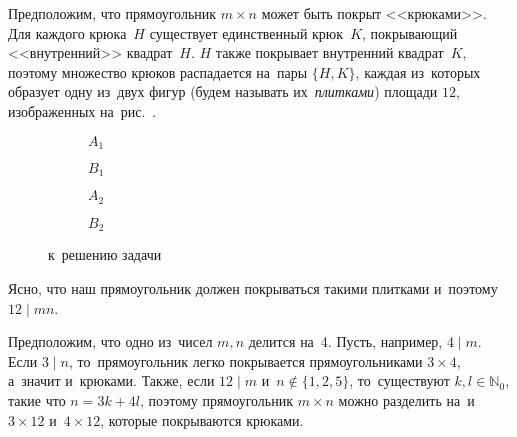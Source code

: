 \ifincludesolutions
Предположим, что прямоугольник $m \times n$ может быть покрыт <<крюками>>.
Для каждого крюка~$H$ существует единственный крюк~$K$, покрывающий
<<внутренний>> квадрат~$H$.
$H$ также покрывает внутренний квадрат~$K$, поэтому множество крюков
распадается на~пары $\{ H, K \}$, каждая из~которых образует одну из~двух фигур
(будем называть их~\emph{плитками}) площади $12$, изображенных
на~рис.~.
\begin{figure}[ht]\begin{center}
\strut\hfill
    \begin{subfigure}{0.2\linewidth}\begin{center}
     $A_1$
    \end{center}\end{subfigure}
\hfill
    \begin{subfigure}{0.15\linewidth}\begin{center}
     $B_1$
    \end{center}\end{subfigure}
\hfill
    \begin{subfigure}{0.2\linewidth}\begin{center}
     $A_2$
    \end{center}\end{subfigure}
\hfill
    \begin{subfigure}{0.2\linewidth}\begin{center}
     $B_2$
    \end{center}\end{subfigure}
\hfill\strut
\caption{к~решению
    задачи~}%
\end{center}\end{figure}
Ясно, что наш прямоугольник должен покрываться такими плитками и~поэтому
$12 \mid m n$.
\par
Предположим, что одно из~чисел $m, n$ делится на~4.
Пусть, например, $4 \mid m$.
Если $3 \mid n$, то~прямоугольник легко покрывается прямоугольниками
$3 \times 4$, а~значит и~крюками.
Также, если $12 \mid m$ и~$n \not\in \{1, 2, 5\}$, то~существуют
$k,l\in\mathbb{N}_0$, такие что $n=3k+4l$, поэтому прямоугольник $m\times n$
можно разделить на~и~$3\times 12$ и~$4\times 12$, которые покрываются крюками.
